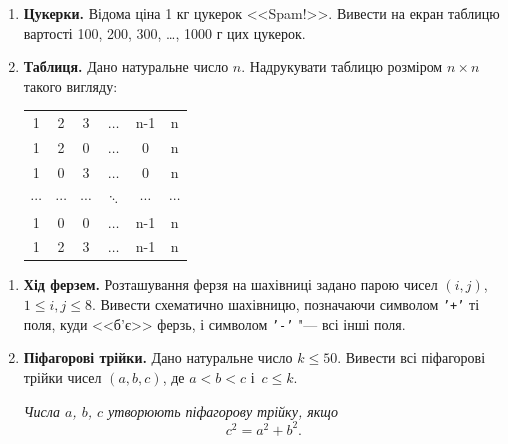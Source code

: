 \begin{enumerate}
\item \textbf{Цукерки.} Відома ціна 1 кг цукерок <<Spam!>>. Вивести на екран таблицю вартості 100, 200, 300, \ldots, 1000 г цих цукерок.

\item \textbf{Таблиця.} Дано натуральне число $n$. Надрукувати таблицю розміром $n\times n$ такого вигляду:
{\ttfamily
	\begin{center}
		\setlength{\tabcolsep}{6pt}
		\begin{tabular}{cccccc}
			1 & 2 & 3 & $\ldots$ & n-1 & n \\
			1 & 2 & 0 & $\ldots$ & 0 & n \\
			1 & 0 & 3 & $\ldots$ & 0 & n  \\
			$\cdots$ & $\cdots$ & $\cdots$ & $\ddots$ & $\cdots$ & $\cdots$\\
			1 & 0 & 0 & $\ldots$ & n-1 & n \\
			1 & 2 & 3 & $\ldots$ & n-1 & n
		\end{tabular}
	\end{center}
}
\end{enumerate}

 


\begin{enumerate}
\item \textbf{Хід ферзем.} Розташування ферзя на шахівниці задано парою чисел $(i, j)$, $1\leqslant i, j\leqslant 8$. Вивести схематично шахівницю, позначаючи символом \texttt{'+'} ті поля, куди <<б'є>> ферзь, і символом \texttt{'-'} "--- всі інші поля.
\item \textbf{Піфагорові трійки.} Дано натуральне число $k\leqslant 50$. Вивести всі піфагорові трійки чисел $(a, b, c)$, де $a<b<c$ і~$c\leqslant k$.

{\itshape Числа $a$, $b$, $c$ утворюють піфагорову трійку, якщо $$c^2=a^2+b^2.$$}
\end{enumerate}

